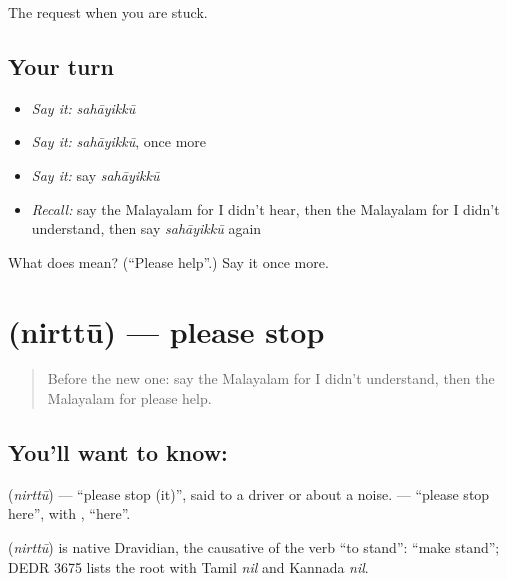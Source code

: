 \begin{grammarlens}[title={What you've built}]
The request when you are stuck.
\end{grammarlens}

\subsection*{Your turn}
\begin{itemize}
\raggedright
  \item \emph{Say it:} \emph{sahāyikkū}
  \item \emph{Say it:} \emph{sahāyikkū}, once more
  \item \emph{Say it:} say \emph{sahāyikkū}
  \item \emph{Recall:} say the Malayalam for I didn't hear, then the Malayalam for I didn't understand, then say \emph{sahāyikkū} again
\end{itemize}

\begin{tcolorbox}[breakable,colback=teal!4,colframe=teal!35!black,title={Before you move on}]
What does  mean? (\textquotedblleft{}Please help\textquotedblright{}.) Say it once more.
\end{tcolorbox}
\section[\texorpdfstring{\ml{നിർത്തൂ} (nirttū)}{നിർത്തൂ (nirttū)}]{ (nirttū) — please stop}

\label{lesson:ML-C120-stop}



\begin{quote}
Before the new one: say the Malayalam for I didn't understand, then the Malayalam for please help.
\end{quote}

\subsection*{You'll want to know: }
\textbf{} (\emph{nirttū}) — \textquotedblleft{}please stop (it)\textquotedblright{}, said to a driver or about a noise. \textbf{ } — \textquotedblleft{}please stop here\textquotedblright{}, with \textbf{}, \textquotedblleft{}here\textquotedblright{}.

\begin{cousinweb}
\textbf{} (\emph{nirttū}) is native Dravidian, the causative of the verb \textquotedblleft{}to stand\textquotedblright{}: \textquotedblleft{}make stand\textquotedblright{}; DEDR 3675 lists the root with Tamil \emph{nil} and Kannada \emph{nil}.
\end{cousinweb}

